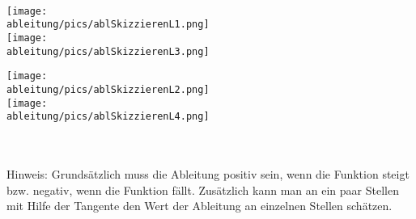 \begin{Answer}[ref=ableitungSkizzierenA1]\\
	\begin{minipage}{\textwidth}
		\begin{minipage}[][][c]{0.49\textwidth}
			\centering\texttt{[image: \\ableitung/pics/ablSkizzierenL1.png]}\vspace{0.2cm}\\
			\centering\texttt{[image: \\ableitung/pics/ablSkizzierenL3.png]}
		\end{minipage}
		\begin{minipage}[][][c]{0.49\textwidth}
			\centering\texttt{[image: \\ableitung/pics/ablSkizzierenL2.png]}\vspace{0.2cm}\\
			\centering\texttt{[image: \\ableitung/pics/ablSkizzierenL4.png]}
		\end{minipage}
	\end{minipage}\\ \\
	Hinweis: Grundsätzlich muss die Ableitung positiv sein, wenn die Funktion steigt bzw. negativ, wenn die Funktion fällt. Zusätzlich kann man an ein paar Stellen mit Hilfe der Tangente den Wert der Ableitung an einzelnen Stellen schätzen.
\end{Answer}
